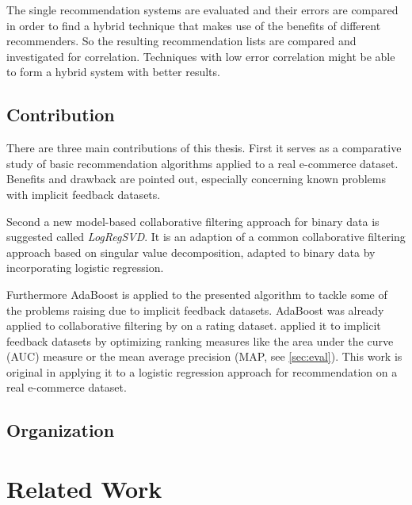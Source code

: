 \documentclass[10pt]{reportMaster}
\begin{document}
The single recommendation systems are evaluated and their errors are compared in order to find a hybrid technique that makes use of the benefits of different recommenders. %
So the resulting recommendation lists are compared and investigated for correlation.
Techniques with low error correlation might be able to form a hybrid system with better results.


\section{Contribution}
There are three main contributions of this thesis.
First it serves as a comparative study of basic recommendation algorithms applied to a real e-commerce dataset.
Benefits and drawback are pointed out, especially concerning known problems with implicit feedback datasets.

Second a new model-based collaborative filtering approach for binary data is suggested called \textit{LogRegSVD}.
It is an adaption of a common collaborative filtering approach based on singular value decomposition, adapted to binary data by incorporating logistic regression.

Furthermore AdaBoost is applied to the presented algorithm to tackle some of the problems raising due to implicit feedback datasets.
AdaBoost was already applied to collaborative filtering by \cite{boostingCFRatings} on a rating dataset.
\cite{boostingAUC} applied it to implicit feedback datasets by optimizing ranking measures like the area under the curve (AUC) measure or the mean average precision (MAP, see \ref{sec:eval}).
This work is original in applying it to a logistic regression approach for recommendation on a real e-commerce dataset.


\section{Organization}






\chapter{Related Work}
\label{sec:relatedWork}
\end{document}
